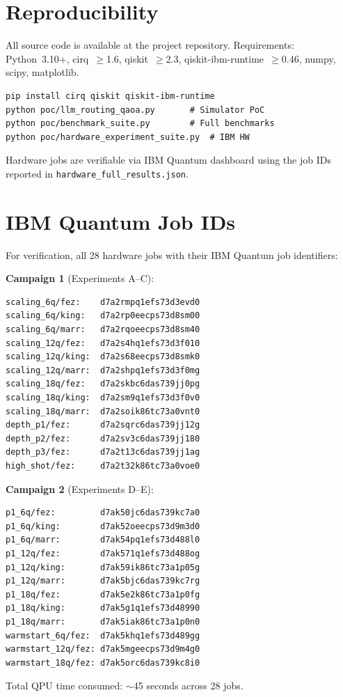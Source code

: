 \documentclass[conference]{IEEEtran}
\begin{document}

\appendix

\section{Reproducibility}

All source code is available at the project repository. Requirements: Python~3.10+, cirq~$\geq$1.6, qiskit~$\geq$2.3, qiskit-ibm-runtime~$\geq$0.46, numpy, scipy, matplotlib.

\begin{verbatim}
pip install cirq qiskit qiskit-ibm-runtime
python poc/llm_routing_qaoa.py       # Simulator PoC
python poc/benchmark_suite.py        # Full benchmarks
python poc/hardware_experiment_suite.py  # IBM HW
\end{verbatim}

Hardware jobs are verifiable via IBM Quantum dashboard using the job IDs reported in \texttt{hardware\_full\_results.json}.

\section{IBM Quantum Job IDs}

For verification, all 28 hardware jobs with their IBM Quantum job identifiers:

\textbf{Campaign 1} (Experiments A--C):
\begin{verbatim}
scaling_6q/fez:    d7a2rmpq1efs73d3evd0
scaling_6q/king:   d7a2rp0eecps73d8sm00
scaling_6q/marr:   d7a2rqoeecps73d8sm40
scaling_12q/fez:   d7a2s4hq1efs73d3f010
scaling_12q/king:  d7a2s68eecps73d8smk0
scaling_12q/marr:  d7a2shpq1efs73d3f0mg
scaling_18q/fez:   d7a2skbc6das739jj0pg
scaling_18q/king:  d7a2sm9q1efs73d3f0v0
scaling_18q/marr:  d7a2soik86tc73a0vnt0
depth_p1/fez:      d7a2sqrc6das739jj12g
depth_p2/fez:      d7a2sv3c6das739jj180
depth_p3/fez:      d7a2t13c6das739jj1ag
high_shot/fez:     d7a2t32k86tc73a0voe0
\end{verbatim}

\textbf{Campaign 2} (Experiments D--E):
\begin{verbatim}
p1_6q/fez:         d7ak50jc6das739kc7a0
p1_6q/king:        d7ak52oeecps73d9m3d0
p1_6q/marr:        d7ak54pq1efs73d488l0
p1_12q/fez:        d7ak571q1efs73d488og
p1_12q/king:       d7ak59ik86tc73a1p05g
p1_12q/marr:       d7ak5bjc6das739kc7rg
p1_18q/fez:        d7ak5e2k86tc73a1p0fg
p1_18q/king:       d7ak5g1q1efs73d48990
p1_18q/marr:       d7ak5iak86tc73a1p0n0
warmstart_6q/fez:  d7ak5khq1efs73d489gg
warmstart_12q/fez: d7ak5mgeecps73d9m4g0
warmstart_18q/fez: d7ak5orc6das739kc8i0
\end{verbatim}

Total QPU time consumed: $\sim$45 seconds across 28 jobs.
\end{document}
